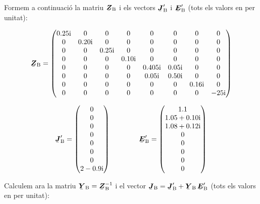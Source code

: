 \begin{exemple}
    Formem a continuació la matriu $\mcmplx{Z}\ped{B}$ i els vectors $\mcmplx{J}\ped{B}'$ i $\mcmplx{E}\ped{B}'$ (tots els valors en per unitat):

    \[
       \mcmplx{Z}\ped{B} =
       \begin{pmatrix}
         \complexnum{j 0,25} & 0 & 0 & 0 & 0 & 0 & 0 & 0 \\
         0 & \complexnum{j 0,20} & 0 & 0 & 0 & 0 & 0 & 0 \\
         0 & 0 & \complexnum{j 0,25} & 0 & 0 & 0 & 0 & 0 \\
         0 & 0 & 0 & \complexnum{j 0,10} & 0 & 0 & 0 & 0 \\
         0 & 0 & 0 & 0 & \complexnum{j 0,405} & \complexnum{j 0,05} & 0 & 0 \\
         0 & 0 & 0 & 0 & \complexnum{j 0,05} & \complexnum{j 0,50} & 0 & 0 \\
         0 & 0 & 0 & 0 & 0 & 0 & \complexnum{j 0,16} & 0 \\
         0 & 0 & 0 & 0 & 0 & 0 & 0 & \complexnum{-j 25}
       \end{pmatrix}
    \]

    \[
       \mcmplx{J}\ped{B}' =
       \begin{pmatrix}
        0 \\
        0 \\
        0 \\
        0 \\
        0 \\
        0 \\
        0 \\
        \complexnum{2 - j 0,9}
       \end{pmatrix}
       \qquad \qquad
       \mcmplx{E}\ped{B}' =
       \begin{pmatrix}
        \num{1,1} \\
        \complexnum{1,05 + j 0,10} \\
        \complexnum{1,08 + j 0,12} \\
        0 \\
        0 \\
        0 \\
        0 \\
        0
       \end{pmatrix}
    \]

    Calculem ara la matriu $\mcmplx{Y}\ped{B}=\mcmplx{Z}\ped{B}^{-1}$ i el vector $\mcmplx{J}\ped{B} = \mcmplx{J}\ped{B}' + \mcmplx{Y}\ped{B} \,\mcmplx{E}\ped{B}'$  (tots els valors en per unitat):


\end{exemple}
